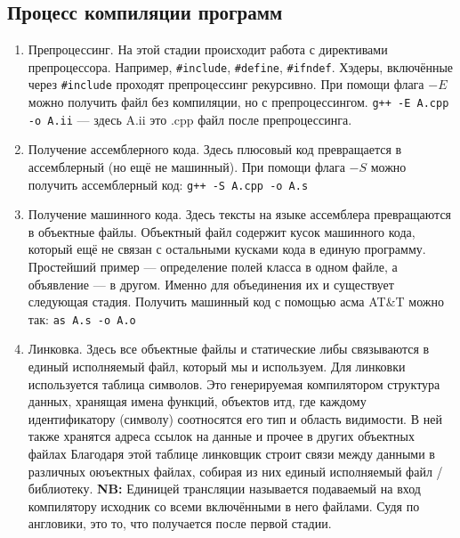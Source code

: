 \documentclass[15pt, a4paper]{article}
\newcommand{\nl}{\newline}
\begin{document}
    \subsection{Процесс компиляции программ}
    \begin{enumerate}
        \item Препроцессинг. \nl
        На этой стадии происходит работа с директивами препроцессора. Например, \texttt{\#include}, \texttt{\#define}, \texttt{\#ifndef}.    
        Хэдеры, включённые через \texttt{\#include} проходят препроцессинг рекурсивно. При помощи флага $-E$ можно получить файл без компиляции, но с препроцессингом. \nl
        \texttt{g++ -E A.cpp -o A.ii} --- здесь A.ii это .cpp файл после препроцессинга.
        \item Получение ассемблерного кода. \nl
        Здесь плюсовый код превращается в ассемблерный (но ещё не машинный). При помощи флага $-S$ можно получить ассемблерный код:
        \texttt{g++ -S A.cpp -o A.s}
        \item Получение машинного кода. \nl
        Здесь тексты на языке ассемблера превращаются в объектные файлы. Объектный файл содержит кусок машинного кода, который ещё не связан с остальными кусками кода в единую программу.
        Простейший пример --- определение полей класса в одном файле, а объявление --- в другом. Именно для объединения их и существует следующая стадия.
        Получить машинный код с помощью асма AT\&T можно так: \texttt{as A.s -o A.o}
        \item Линковка. \nl
        Здесь все объектные файлы и статические либы связываются в единый исполняемый файл, который мы и используем.
        Для линковки используется таблица символов. Это генерируемая компилятором структура данных, хранящая имена функций, объектов итд,
        где каждому идентификатору (символу) соотносятся его тип и область видимости. В ней также хранятся адреса ссылок на данные и прочее в других объектных файлах
        Благодаря этой таблице линковщик строит связи между данными в различных оюъектных файлах, собирая из них единый исполняемый файл / библиотеку. \nl
        \textbf{NB:} Единицей трансляции называется подаваемый на вход компилятору исходник со всеми включёнными в него файлами. Судя по англовики, это то, что получается после первой стадии.
    \end{enumerate}
\end{document}
